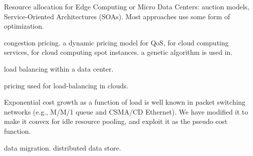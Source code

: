 Resource allocation for Edge Computing or Micro Data Centers: auction models\cite{Xu2017-zenith,Zhang2017-VMauction},
Service-Oriented Architectures (SOAs)\cite{Suresh-SOA-SOCC2017}.
Most approaches use some form of optimization.

congestion pricing\cite{gibbens1999resource,Henderson2001}.
a dynamic pricing model for QoS\cite{Briscoe2003-M3I},
for cloud computing services\cite{Wang-hotcloud2010,Kilcioglu-SIGMETRICS2015},
for cloud computing spot instances\cite{Song-INFOCOM2017}.
a genetic algorithm is used in\cite{Macias-SAC2011}.

load balancing within a data center\cite{Rikhtegar2021BiTEAD}.

pricing used for load-balancing in clouds\cite{Song-2014,Ren-2017}.

Exponential cost growth as a function of load is well known in packet
switching networks (e.g., M/M/1 queue and CSMA/CD Ethernet).
We have modified it to make it convex for idle resource pooling, and
exploit it as the pseudo cost function.

data migration\cite{Pu2015-geodistdata}.
distributed data store\cite{Shima2012,Tahoe-2008}.
